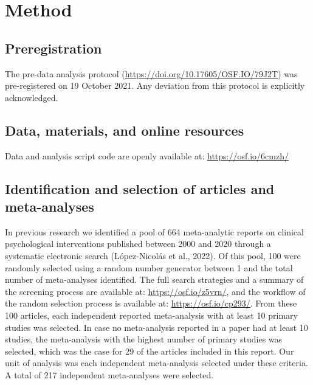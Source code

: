 \documentclass[
  ,apa7,floatsintext]{apa6}
\begin{document}
\hypertarget{method}{%
\section{Method}\label{method}}

\hypertarget{preregistration}{%
\subsection{Preregistration}\label{preregistration}}

The pre-data analysis protocol (\url{https://doi.org/10.17605/OSF.IO/79J2T}) was pre-registered on 19 October 2021. Any deviation from this protocol is explicitly acknowledged.

\hypertarget{data-materials-and-online-resources}{%
\subsection{Data, materials, and online resources}\label{data-materials-and-online-resources}}

Data and analysis script code are openly available at: \url{https://osf.io/6cmzh/}

\hypertarget{identification-and-selection-of-articles-and-meta-analyses}{%
\subsection{Identification and selection of articles and meta-analyses}\label{identification-and-selection-of-articles-and-meta-analyses}}

In previous research we identified a pool of 664 meta-analytic reports on clinical psychological interventions published between 2000 and 2020 through a systematic electronic search (López-Nicolás et al., 2022). Of this pool, 100 were randomly selected using a random number generator between 1 and the total number of meta-analyses identified. The full search strategies and a summary of the screening process are available at: \url{https://osf.io/z5vrn/}, and the workflow of the random selection process is available at: \url{https://osf.io/cp293/}.
From these 100 articles, each independent reported meta-analysis with at least 10 primary studies was selected. In case no meta-analysis reported in a paper had at least 10 studies, the meta-analysis with the highest number of primary studies was selected, which was the case for 29 of the articles included in this report. Our unit of analysis was each independent meta-analysis selected under these criteria. A total of 217 independent meta-analyses were selected.
\end{document}
